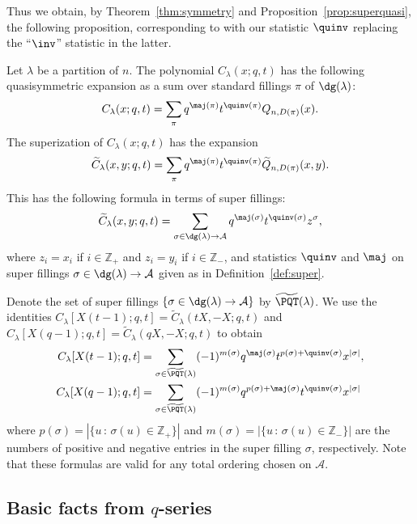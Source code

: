 Thus we obtain, by Theorem~\ref{thm:symmetry} and Proposition~\ref{prop:superquasi}, the following proposition, corresponding to \cite[Proposition 4.3]{HHL05} with our statistic $\quinv$ replacing the ``$\inv$'' statistic in the latter.

\begin{proposition}
Let $\lambda$ be a partition of $n$. The polynomial $C_{\lambda}(x;q,t)$ has the following quasisymmetric expansion as a sum over standard fillings $\pi$ of $\dg(\lambda)$:
\[
C_{\lambda}(x;q,t) = \sum_{\pi} q^{\maj(\pi)}t^{\quinv(\pi)}Q_{n,D(\pi)}(x).
\]
The superization of $C_{\lambda}(x;q,t)$ has the expansion
\[
\widetilde{C}_{\lambda}(x,y;q,t) = \sum_{\pi} q^{\maj(\pi)}t^{\quinv(\pi)}\widetilde{Q}_{n,D(\pi)}(x,y).
\]
This has the following formula in terms of super fillings:
\[
\widetilde{C}_{\lambda}(x,y;q,t) = \sum_{\sigma\in \dg(\lambda) \rightarrow \mathcal{A}} q^{\maj(\sigma)}t^{\quinv(\sigma)}z^{\sigma},
\] 
where $z_i = x_i$ if $i\in\mathbb{Z}_+$ and $z_i = y_i$ if $i\in\mathbb{Z}_-$, and statistics $\quinv$ and $\maj$ on super fillings $\sigma\in \dg(\lambda) \rightarrow \mathcal{A}$ given as in Definition~\ref{def:super}. 
\end{proposition}

Denote the set of super fillings $\{\sigma\in \dg(\lambda) \rightarrow \mathcal{A}\}$ by $\widetilde{\PQT}(\lambda)$. We use the identities $C_{\lambda}[X(t-1);q,t]=\widetilde{C}_{\lambda}(tX,-X;q,t)$ and $C_{\lambda}[X(q-1);q,t]=\widetilde{C}_{\lambda}(qX,-X;q,t)$ to obtain
\begin{align}
C_{\lambda}[X(t-1);q,t]& = \sum_{\sigma\in \widetilde{\PQT}(\lambda)} (-1)^{m(\sigma)} q^{\maj(\sigma)}t^{p(\sigma)+\quinv(\sigma)}x^{|\sigma|}, \label{C1}\\
C_{\lambda}[X(q-1);q,t]& = \sum_{\sigma\in \widetilde{\PQT}(\lambda)} (-1)^{m(\sigma)} q^{p(\sigma)+\maj(\sigma)}t^{\quinv(\sigma)}x^{|\sigma|} \label{C2}
\end{align}
where $p(\sigma) = |\{u\,:\,\sigma(u)\in\mathbb{Z}_+\}|$ and $m(\sigma) = |\{u\,:\,\sigma(u)\in\mathbb{Z}_-\}|$ are the numbers of positive and negative entries in the super filling $\sigma$, respectively. Note that these formulas are valid for any total ordering chosen on $\mathcal{A}$. 

\subsection{Basic facts from $q$-series}\label{sec:qseries}

